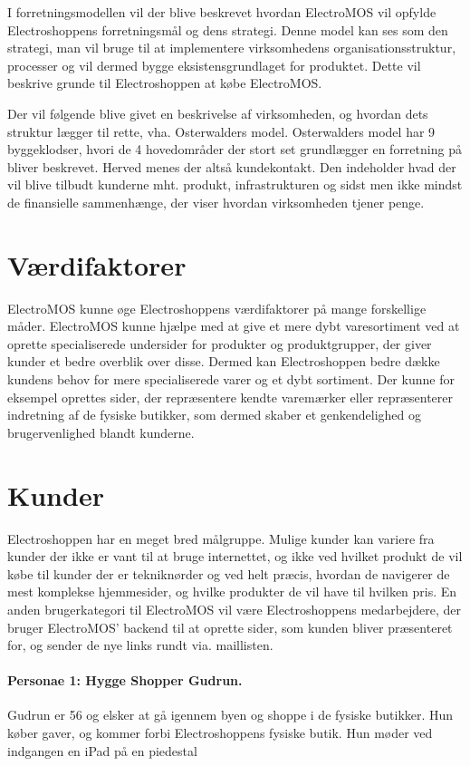 
I forretningsmodellen vil der blive beskrevet hvordan ElectroMOS vil opfylde Electroshoppens forretningsmål og dens strategi. Denne model kan ses som den strategi, man vil bruge til at implementere virksomhedens organisationsstruktur, processer og vil dermed bygge eksistensgrundlaget for produktet. Dette vil beskrive grunde til Electroshoppen at købe ElectroMOS.

Der vil følgende blive givet en beskrivelse af virksomheden, og hvordan dets struktur lægger til rette, vha. Osterwalders model. Osterwalders model har 9 byggeklodser, hvori de 4 hovedområder der stort set grundlægger en forretning på bliver beskrevet. Herved menes der altså kundekontakt. Den indeholder hvad der vil blive tilbudt kunderne mht. produkt, infrastrukturen og sidst men ikke mindst de finansielle sammenhænge, der viser hvordan virksomheden tjener penge.

\section{Værdifaktorer}
ElectroMOS kunne øge Electroshoppens værdifaktorer på mange forskellige måder. ElectroMOS kunne hjælpe med at give et mere dybt varesortiment ved at oprette specialiserede undersider for produkter og produktgrupper, der giver kunder et bedre overblik over disse. Dermed kan Electroshoppen bedre dække kundens behov for mere specialiserede varer og et dybt sortiment. Der kunne for eksempel oprettes sider, der repræsentere kendte varemærker eller repræsenterer indretning af de fysiske butikker, som dermed skaber et genkendelighed og brugervenlighed blandt kunderne.

\section{Kunder}
Electroshoppen har en meget bred målgruppe. Mulige kunder kan variere fra kunder der ikke er vant til at bruge internettet, og ikke ved hvilket produkt de vil købe til kunder der er tekniknørder og ved helt præcis, hvordan de navigerer de mest komplekse hjemmesider, og hvilke produkter de vil have til hvilken pris. En anden brugerkategori til ElectroMOS vil være Electroshoppens medarbejdere, der bruger ElectroMOS’ backend til at oprette sider, som kunden bliver præsenteret for, og sender de nye links rundt via. maillisten. 


\paragraph{Personae 1: Hygge Shopper Gudrun.}
Gudrun er 56 og elsker at gå igennem byen og shoppe i de fysiske butikker. Hun køber gaver, og kommer forbi Electroshoppens fysiske butik. Hun møder ved indgangen en iPad på en piedestal 


